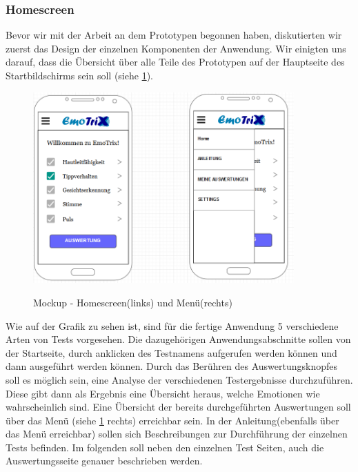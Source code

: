 \subsubsection{Homescreen}
Bevor wir mit der Arbeit an dem Prototypen begonnen haben, diskutierten wir zuerst das Design der einzelnen Komponenten der Anwendung. Wir einigten uns darauf, dass die Übersicht über alle Teile des Prototypen auf der Hauptseite des Startbildschirms sein soll (siehe \ref{img:Mockup-Home}).
\begin{figure}[h]
	\centering
	\includegraphics[width=10cm]{Bilder/Mockup-Home.png}
	\label{img:Mockup-Home}
	\caption[Mockup - Homescreen(links) und Menü(rechts)]{Mockup - Homescreen(links) und Menü(rechts)}
\end{figure}%
Wie auf der Grafik zu sehen ist, sind für die fertige Anwendung 5 verschiedene Arten von Tests vorgesehen. Die dazugehörigen Anwendungsabschnitte sollen von der Startseite, durch anklicken des Testnamens aufgerufen werden können und dann ausgeführt werden können. Durch das Berühren des Auswertungsknopfes soll es möglich sein, eine Analyse der verschiedenen Testergebnisse durchzuführen. Diese gibt dann als Ergebnis eine Übersicht heraus, welche Emotionen wie wahrscheinlich sind. Eine Übersicht der bereits durchgeführten Auswertungen soll über das Menü (siehe \ref{img:Mockup-Home} rechts) erreichbar sein. In der Anleitung(ebenfalls über das Menü erreichbar) sollen sich Beschreibungen zur Durchführung der einzelnen Tests befinden.\newline
Im folgenden soll neben den einzelnen Test Seiten, auch die Auswertungsseite genauer beschrieben werden.  \newline
